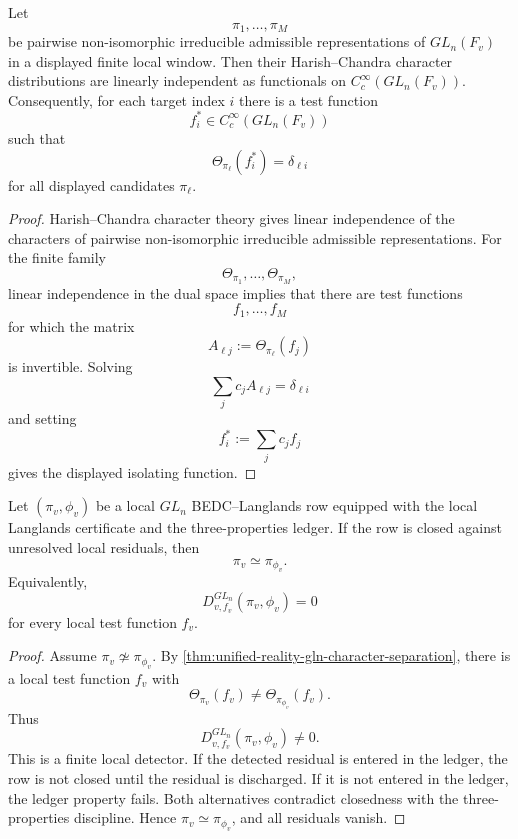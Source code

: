 \begin{theorem}
\label{thm:unified-reality-gln-character-separation}
Let
$$
\pi_1,\ldots,\pi_M
$$
be pairwise non-isomorphic irreducible admissible representations of
$GL_n(F_v)$ in a displayed finite local window. Then their
Harish--Chandra character distributions are linearly independent as
functionals on $C_c^\infty(GL_n(F_v))$. Consequently, for each target
index $i$ there is a test function
$$
f_i^\ast\in C_c^\infty(GL_n(F_v))
$$
such that
$$
\Theta_{\pi_\ell}(f_i^\ast)=\delta_{\ell i}
$$
for all displayed candidates $\pi_\ell$.
\end{theorem}
\begin{proof}
Harish--Chandra character theory gives linear independence of the
characters of pairwise non-isomorphic irreducible admissible
representations. For the finite family
$$
\Theta_{\pi_1},\ldots,\Theta_{\pi_M},
$$
linear independence in the dual space implies that there are test
functions
$$
f_1,\ldots,f_M
$$
for which the matrix
$$
A_{\ell j}:=\Theta_{\pi_\ell}(f_j)
$$
is invertible. Solving
$$
\sum_j c_j A_{\ell j}=\delta_{\ell i}
$$
and setting
$$
f_i^\ast:=\sum_j c_j f_j
$$
gives the displayed isolating function.
\end{proof}

\begin{theorem}
\label{thm:unified-reality-gln-ramified-local-no-hidden-residual}
Let $(\pi_v,\phi_v)$ be a local $GL_n$ BEDC--Langlands row equipped with
the local Langlands certificate and the three-properties ledger. If the
row is closed against unresolved local residuals, then
$$
\pi_v\simeq\pi_{\phi_v}.
$$
Equivalently,
$$
D^{GL_n}_{v,f_v}(\pi_v,\phi_v)=0
$$
for every local test function $f_v$.
\end{theorem}
\begin{proof}
Assume $\pi_v\not\simeq\pi_{\phi_v}$. By
\autoref{thm:unified-reality-gln-character-separation}, there is a
local test function $f_v$ with
$$
\Theta_{\pi_v}(f_v)\ne\Theta_{\pi_{\phi_v}}(f_v).
$$
Thus
$$
D^{GL_n}_{v,f_v}(\pi_v,\phi_v)\ne0.
$$
This is a finite local detector. If the detected residual is entered in
the ledger, the row is not closed until the residual is discharged. If
it is not entered in the ledger, the ledger property fails. Both
alternatives contradict closedness with the three-properties discipline.
Hence $\pi_v\simeq\pi_{\phi_v}$, and all residuals vanish.
\end{proof}

